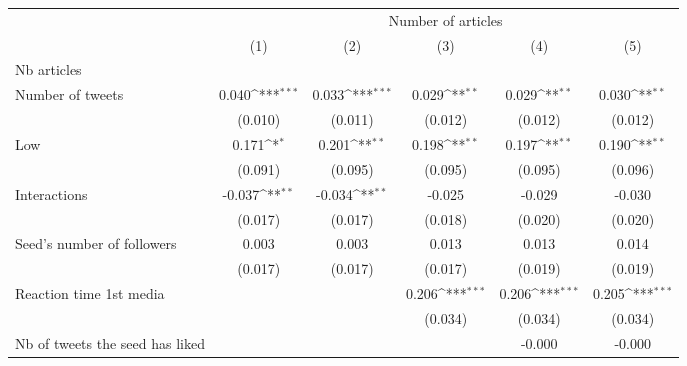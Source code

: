{
\def\sym#1{\ifmmode^{#1}\else\(^{#1}\)\fi}
\begin{tabular}{l*{5}{c}}
\hline\hline
                    &\multicolumn{5}{c}{Number of articles}                                                                       \\\cmidrule(lr){2-6}
                    &\multicolumn{1}{c}{(1)}         &\multicolumn{1}{c}{(2)}         &\multicolumn{1}{c}{(3)}         &\multicolumn{1}{c}{(4)}         &\multicolumn{1}{c}{(5)}         \\
\hline
Nb articles         &                     &                     &                     &                     &                     \\
Number of tweets    &       0.040\sym{***}&       0.033\sym{***}&       0.029\sym{**} &       0.029\sym{**} &       0.030\sym{**} \\
                    &     (0.010)         &     (0.011)         &     (0.012)         &     (0.012)         &     (0.012)         \\
Low                 &       0.171\sym{*}  &       0.201\sym{**} &       0.198\sym{**} &       0.197\sym{**} &       0.190\sym{**} \\
                    &     (0.091)         &     (0.095)         &     (0.095)         &     (0.095)         &     (0.096)         \\
Interactions        &      -0.037\sym{**} &      -0.034\sym{**} &      -0.025         &      -0.029         &      -0.030         \\
                    &     (0.017)         &     (0.017)         &     (0.018)         &     (0.020)         &     (0.020)         \\
Seed's number of followers&       0.003         &       0.003         &       0.013         &       0.013         &       0.014         \\
                    &     (0.017)         &     (0.017)         &     (0.017)         &     (0.019)         &     (0.019)         \\
Reaction time 1st media&                     &                     &       0.206\sym{***}&       0.206\sym{***}&       0.205\sym{***}\\
                    &                     &                     &     (0.034)         &     (0.034)         &     (0.034)         \\
Nb of tweets the seed has liked&                     &                     &                     &      -0.000         &      -0.000         \\

\end{tabular}}
